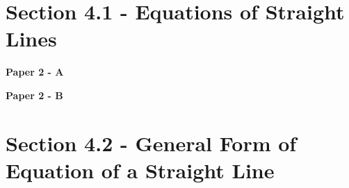 \documentclass[12pt, a4paper]{article}
\begin{document}
\section*{Section 4.1 - Equations of Straight Lines}\label{section:4-4-1}

\textbf{Paper 2 - A}
\begin{enumx}[label=\arabic*.,start=1]
\item {}\label{DSE2012P-CoreP2-Q07} 
\item {}\label{DSE2012-CoreP2-Q25} 
\item {}\label{DSE2013-CoreP2-Q14} 
\item {}\label{DSE2014-CoreP2-Q25} 
\item {}\label{DSE2015-CoreP2-Q25} 
\item {}\label{DSE2017-CoreP2-Q23} 
\item {}\label{DSE2017-CoreP2-Q24} 
\item {}\label{DSE2019-CoreP2-Q23} 
\item {}\label{DSE2020-CoreP2-Q26} 
\end{enumx}
\textbf{Paper 2 - B}
\begin{enumx}[label=\arabic*.,start=10]
\item {}\label{DSE2017-CoreP2-Q41} 
\end{enumx}




\section*{Section 4.2 - General Form of Equation of a Straight Line}\label{section:4-4-2}
\end{document}
